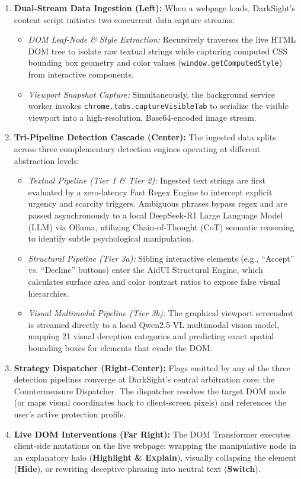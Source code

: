 \documentclass[11pt,a4paper]{article}
\begin{document}
\begin{enumerate}[leftmargin=*]
    \item \textbf{Dual-Stream Data Ingestion (Left):} When a webpage loads, DarkSight's content script initiates two concurrent data capture streams:
    \begin{itemize}
        \item \textit{DOM Leaf-Node \& Style Extraction:} Recursively traverses the live HTML DOM tree to isolate raw textual strings while capturing computed CSS bounding box geometry and color values (\texttt{window.getComputedStyle}) from interactive components.
        \item \textit{Viewport Snapshot Capture:} Simultaneously, the background service worker invokes \texttt{chrome.tabs.captureVisibleTab} to serialize the visible viewport into a high-resolution, Base64-encoded image stream.
    \end{itemize}

    \item \textbf{Tri-Pipeline Detection Cascade (Center):} The ingested data splits across three complementary detection engines operating at different abstraction levels:
    \begin{itemize}
        \item \textit{Textual Pipeline (Tier 1 \& Tier 2):} Ingested text strings are first evaluated by a zero-latency Fast Regex Engine to intercept explicit urgency and scarcity triggers. Ambiguous phrases bypass regex and are passed asynchronously to a local DeepSeek-R1 Large Language Model (LLM) via Ollama, utilizing Chain-of-Thought (CoT) semantic reasoning to identify subtle psychological manipulation.
        \item \textit{Structural Pipeline (Tier 3a):} Sibling interactive elements (e.g., ``Accept'' vs. ``Decline'' buttons) enter the AidUI Structural Engine, which calculates surface area and color contrast ratios to expose false visual hierarchies.
        \item \textit{Visual Multimodal Pipeline (Tier 3b):} The graphical viewport screenshot is streamed directly to a local Qwen2.5-VL multimodal vision model, mapping 21 visual deception categories and predicting exact spatial bounding boxes for elements that evade the DOM.
    \end{itemize}

    \item \textbf{Strategy Dispatcher (Right-Center):} Flags emitted by any of the three detection pipelines converge at DarkSight's central arbitration core: the Countermeasure Dispatcher. The dispatcher resolves the target DOM node (or maps visual coordinates back to client-screen pixels) and references the user's active protection profile.

    \item \textbf{Live DOM Interventions (Far Right):} The DOM Transformer executes client-side mutations on the live webpage: wrapping the manipulative node in an explanatory halo (\textbf{Highlight \& Explain}), visually collapsing the element (\textbf{Hide}), or rewriting deceptive phrasing into neutral text (\textbf{Switch}).
\end{enumerate}
\end{document}
